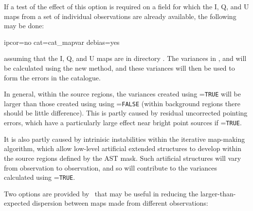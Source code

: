 If a test of the effect of this option is required on a field for which
the I, Q, and U maps from a set of individual observations are already
available, the following may be done:

\begin{terminalv}
                   ipcor=no cat=cat_mapvar debias=yes
\end{terminalv}

assuming that the I, Q, and U maps are in directory . The
variances in ,  and
 will be calculated using the new method, and
these variances will then be used to form the errors in the
 catalogue.

In general, within the source regions, the variances created using
=\texttt{TRUE} will be larger than those created using
using =\texttt{FALSE} (within background regions there
should be little difference).  This is partly caused by residual
uncorrected pointing errors, which have a particularly large effect near
bright point sources if =\texttt{TRUE}.

It is also partly caused by intrinisic instabilities within the iterative
map-making algorithm, which allow low-level artificial extended structures
to develop within the source regions defined by the AST mask. Such
artificial structures will vary from observation to observation, and so
will contribute to the variances calculated using =\texttt{TRUE}.

Two options are provided by \poltwomap\ that may be useful in reducing
the larger-than-expected dispersion between maps made from different
observations:

